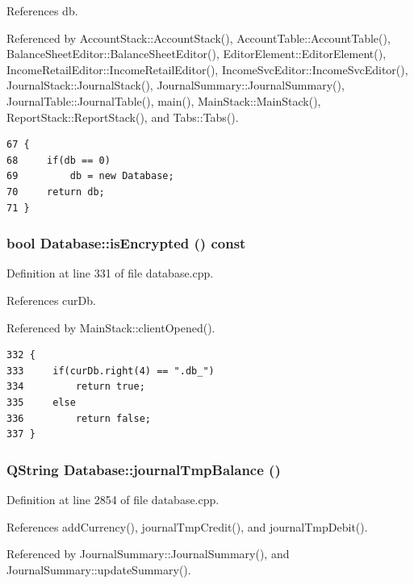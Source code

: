 References db.

Referenced by Account\-Stack::Account\-Stack(), Account\-Table::Account\-Table(), Balance\-Sheet\-Editor::Balance\-Sheet\-Editor(), Editor\-Element::Editor\-Element(), Income\-Retail\-Editor::Income\-Retail\-Editor(), Income\-Svc\-Editor::Income\-Svc\-Editor(), Journal\-Stack::Journal\-Stack(), Journal\-Summary::Journal\-Summary(), Journal\-Table::Journal\-Table(), main(), Main\-Stack::Main\-Stack(), Report\-Stack::Report\-Stack(), and Tabs::Tabs().

\footnotesize\begin{verbatim}67 {
68     if(db == 0)
69         db = new Database;
70     return db;
71 }
\end{verbatim}\normalsize 


\hypertarget{classDatabase_a7}{
\subsubsection[isEncrypted]{\setlength{\rightskip}{0pt plus 5cm}bool Database::is\-Encrypted () const}}
\label{classDatabase_a7}


Definition at line 331 of file database.cpp.

References cur\-Db.

Referenced by Main\-Stack::client\-Opened().

\footnotesize\begin{verbatim}332 {
333     if(curDb.right(4) == ".db_")
334         return true;
335     else
336         return false;
337 }
\end{verbatim}\normalsize 


\hypertarget{classDatabase_a45}{
\subsubsection[journalTmpBalance]{\setlength{\rightskip}{0pt plus 5cm}QString Database::journal\-Tmp\-Balance ()}}
\label{classDatabase_a45}


Definition at line 2854 of file database.cpp.

References add\-Currency(), journal\-Tmp\-Credit(), and journal\-Tmp\-Debit().

Referenced by Journal\-Summary::Journal\-Summary(), and Journal\-Summary::update\-Summary().

